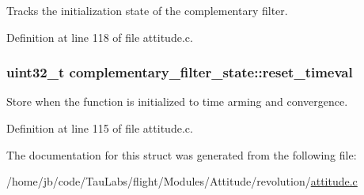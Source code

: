 \-Tracks the initialization state of the complementary filter. 



\-Definition at line 118 of file attitude.\-c.

\hypertarget{structcomplementary__filter__state_a5b8422bb68fa412d1ff92c82331c18ec}{
\subsubsection[{reset\-\_\-timeval}]{\setlength{\rightskip}{0pt plus 5cm}uint32\-\_\-t {\bf complementary\-\_\-filter\-\_\-state\-::reset\-\_\-timeval}}}\label{structcomplementary__filter__state_a5b8422bb68fa412d1ff92c82331c18ec}


\-Store when the function is initialized to time arming and convergence. 



\-Definition at line 115 of file attitude.\-c.



\-The documentation for this struct was generated from the following file\-:\begin{DoxyCompactItemize}
\item 
/home/jb/code/\-Tau\-Labs/flight/\-Modules/\-Attitude/revolution/\hyperlink{revolution_2attitude_8c}{attitude.\-c}\end{DoxyCompactItemize}

